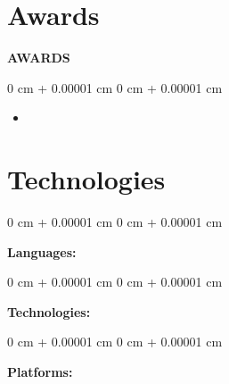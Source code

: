 \documentclass[10pt, letterpaper]{article}
\newenvironment{highlights}{
    \begin{itemize}[
        topsep=0.10 cm,
        parsep=0.10 cm,
        partopsep=0pt,
        itemsep=0pt,
        leftmargin=0 cm + 10pt
    ]
}{
    \end{itemize}
} %
\newenvironment{onecolentry}{
    \begin{adjustwidth}{
        0 cm + 0.00001 cm
    }{
        0 cm + 0.00001 cm
    }
}{
    \end{adjustwidth}
} %
\begin{document}
\section{Awards}
\textbf{AWARDS}
\begin{onecolentry}
\begin{highlights}
\item {}
\end{highlights}
\end{onecolentry}


\vspace{0.2cm}
\section{Technologies}
\begin{onecolentry}
\textbf{Languages:} 
\end{onecolentry}
\vspace{0.2 cm}
\begin{onecolentry}
\textbf{Technologies:} 
\end{onecolentry}
\vspace{0.2 cm}
\begin{onecolentry}
\textbf{Platforms:} 
\end{onecolentry}
\end{document}
